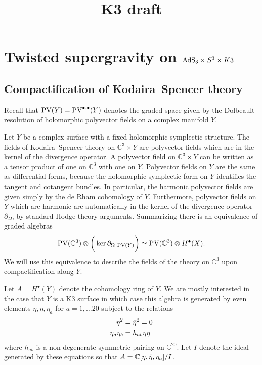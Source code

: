 \documentclass[11pt]{amsart}
\date{}
\title{K3 draft}
\newcommand{\PV}{\op{PV}}
\newcommand{\br}{\overline}
\newcommand{\CC}{\mathbb C}
\def\PV{{\rm PV}}
\newcommand{\op}{\operatorname}
\def\bu{{\bullet}}
\def\beqn{\begin{equation}}
\def\eeqn{\end{equation}}
\theoremstyle{thm}
\numberwithin{equation}{subsection}
\theoremstyle{def}
\theoremstyle{rem}
\renewcommand\div{{\partial_\Omega}}
\begin{document}
\maketitle

\section{Twisted supergravity on ${\rm AdS}_3 \times S^3 \times K3$}

\subsection{Compactification of Kodaira--Spencer theory}

Recall that $\PV (Y) = \PV^{\bu,\bu}(Y)$ denotes the graded space given by the Dolbeault resolution of holomorphic polyvector fields on a complex manifold $Y$.

Let $Y$ be a complex surface with a fixed holomorphic symplectic structure.
The fields of Kodaira--Spencer theory on $\CC^3 \times Y$ are polyvector fields which are in the kernel of the divergence operator.
A polyvector field on $\CC^3 \times Y$ can be written as a tensor product of one on $\CC^3$ with one on $Y$.  
Polyvector fields on $Y$ are the same as differential forms, because the holomorphic symplectic form on $Y$ identifies the tangent and cotangent bundles. 
In particular, the harmonic polyvector fields are given simply by the de Rham cohomology of $Y$.  
Furthermore, polyvector fields on $Y$ which are harmonic are automatically in the kernel of the divergence operator $\div$, by standard Hodge theory arguments.   
Summarizing there is an equivalence of graded algebras
\[
\PV (\CC^3) \otimes \bigg(\ker \div |_{\PV(Y)} \bigg) \simeq \PV(\CC^3) \otimes H^\bu(X) .
\]
We will use this equivalence to describe the fields of the theory on $\CC^3$ upon compactification along $Y$. 

Let $A = H^\bu(Y)$ denote the cohomology ring of $Y$.
We are mostly interested in the case that $Y$ is a K3 surface in which case this algebra is generated by even elements $\eta, \br \eta, \eta_a$ for $a=1,\ldots 20$ subject to the relations
\beqn
\label{eqn:K3rel}
\begin{split}
\eta^2 & = \Bar{\eta}^2 = 0 \\
\eta_a \eta_b & = h_{ab} \eta \Bar{\eta} 
\end{split}
\eeqn
where $h_{ab}$ is a non-degenerate symmetric pairing on $\CC^{20}$. 
Let $I$ denote the ideal generated by these equations so that $A = \CC[\eta,\Bar{\eta}, \eta_a] / I$. 
\end{document}
